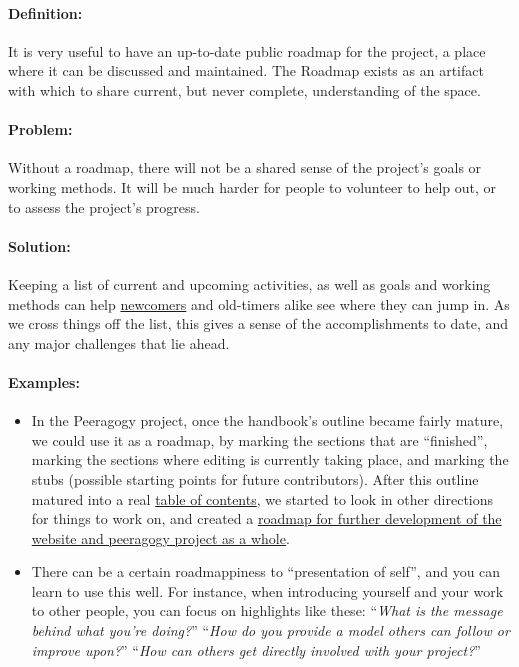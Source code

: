 \paragraph{Definition:} It is very useful to have an up-to-date public
roadmap for the project, a place where it can be discussed and
maintained. The Roadmap exists as an artifact with which to share
current, but never complete, understanding of the space.

\paragraph{Problem:} Without a roadmap, there will not be a shared sense of
the project's goals or working methods. It will be much harder for
people to volunteer to help out, or to assess the project's progress.

\paragraph{Solution:} Keeping a list of current and upcoming activities, as
well as goals and working methods can
help \href{http://peeragogy.org/practice/heuristics/newcomer/}{newcomers}
and old-timers alike see where they can jump in. As we cross things off
the list, this gives a sense of the accomplishments to date, and any
major challenges that lie ahead.

\paragraph{Examples:}

\begin{itemize}
\item
  In the Peeragogy project, once the handbook's outline became fairly
  mature, we could use it as a roadmap, by marking the sections that are
  ``finished'', marking the sections where editing is currently taking
  place, and marking the stubs (possible starting points for future
  contributors). After this outline matured into a
  real \href{http://peeragogy.org/table-of-contents/}{table of contents},
  we started to look in other directions for things to work on, and
  created a \href{http://peeragogy.org/peeragogy-org-roadmap/}{roadmap
  for further development of the website and peeragogy project as a
  whole}.
\item
  There can be a certain roadmappiness to ``presentation of self'', and
  you can learn to use this well. For instance, when introducing
  yourself and your work to other people, you can focus on highlights
  like these: ``\emph{What is the message behind what you're doing?}''
    ``\emph{How do you provide a model others can follow or improve upon?}''
    ``\emph{How can others get directly involved with your project?}''
\end{itemize}


